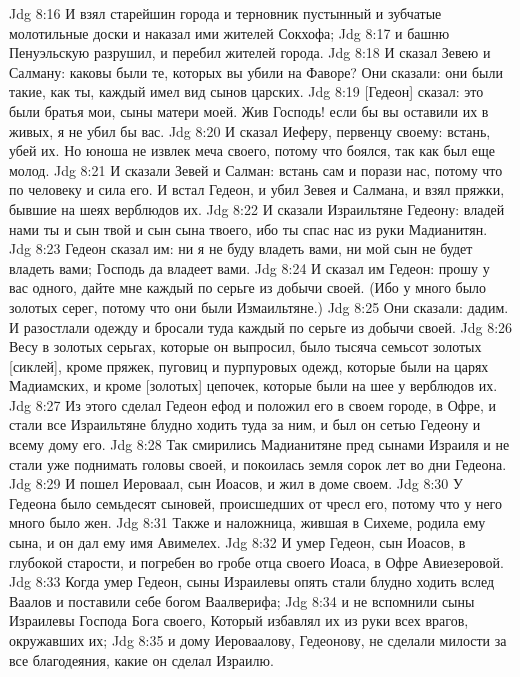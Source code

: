 \vs Jdg 8:16 И взял старейшин города и терновник пустынный и зубчатые молотильные доски и наказал ими жителей Сокхофа;
\vs Jdg 8:17 и башню Пенуэльскую разрушил, и перебил жителей города.
\vs Jdg 8:18 И сказал Зевею и Салману: каковы были те, которых вы убили на Фаворе? Они сказали: они были такие, как ты, каждый имел вид сынов царских.
\vs Jdg 8:19 [Гедеон] сказал: это были братья мои, сыны матери моей. Жив Господь! если бы вы оставили их в живых, я не убил бы вас.
\vs Jdg 8:20 И сказал Иеферу, первенцу своему: встань, убей их. Но юноша не извлек меча своего, потому что боялся, так как был еще молод.
\vs Jdg 8:21 И сказали Зевей и Салман: встань сам и порази нас, потому что по человеку и сила его. И встал Гедеон, и убил Зевея и Салмана, и взял пряжки, бывшие на шеях верблюдов их.
\vs Jdg 8:22 И сказали Израильтяне Гедеону: владей нами ты и сын твой и сын сына твоего, ибо ты спас нас из руки Мадианитян.
\vs Jdg 8:23 Гедеон сказал им: ни я не буду владеть вами, ни мой сын не будет владеть вами; Господь да владеет вами.
\vs Jdg 8:24 И сказал им Гедеон: прошу у вас одного, дайте мне каждый по серьге из добычи своей. (Ибо у  много было золотых серег, потому что они были Измаильтяне.)
\vs Jdg 8:25 Они сказали: дадим. И разостлали одежду и бросали туда каждый по серьге из добычи своей.
\vs Jdg 8:26 Весу в золотых серьгах, которые он выпросил, было тысяча семьсот золотых [сиклей], кроме пряжек, пуговиц и пурпуровых одежд, которые были на царях Мадиамских, и кроме [золотых] цепочек, которые были на шее у верблюдов их.
\vs Jdg 8:27 Из этого сделал Гедеон ефод и положил его в своем городе, в Офре, и стали все Израильтяне блудно ходить туда за ним, и был он сетью Гедеону и всему дому его.
\rsbpar\vs Jdg 8:28 Так смирились Мадианитяне пред сынами Израиля и не стали уже поднимать головы своей, и покоилась земля сорок лет во дни Гедеона.
\vs Jdg 8:29 И пошел Иероваал, сын Иоасов, и жил в доме своем.
\rsbpar\vs Jdg 8:30 У Гедеона было семьдесят сыновей, происшедших от чресл его, потому что у него много было жен.
\vs Jdg 8:31 Также и наложница, жившая в Сихеме, родила ему сына, и он дал ему имя Авимелех.
\vs Jdg 8:32 И умер Гедеон, сын Иоасов, в глубокой старости, и погребен во гробе отца своего Иоаса, в Офре Авиезеровой.
\vs Jdg 8:33 Когда умер Гедеон, сыны Израилевы опять стали блудно ходить вслед Ваалов и поставили себе богом Ваалверифа;
\vs Jdg 8:34 и не вспомнили сыны Израилевы Господа Бога своего, Который избавлял их из руки всех врагов, окружавших их;
\vs Jdg 8:35 и дому Иероваалову,  Гедеонову, не сделали милости за все благодеяния, какие он сделал Израилю.
